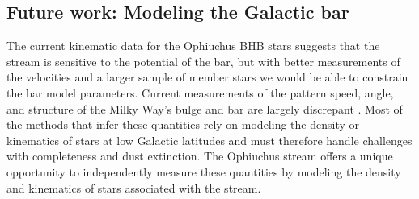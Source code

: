 \documentclass[letterpaper,12pt,preprint]{aastex}
\newcommand{\todo}[1]{{\color{red} TODO: #1}}
\begin{document}
%
%
%
%
%
%

\subsection{Future work: Modeling the Galactic bar}

The current kinematic data for the Ophiuchus BHB stars suggests that the stream is sensitive to the potential of the bar, but with better measurements of the velocities and a larger sample of member stars we would be able to constrain the bar model parameters. Current measurements of the pattern speed, angle, and structure of the Milky Way's bulge and bar are largely discrepant \citep[e.g.,][]{wang12, wang13, antoja14, wegg?? is wegg appropriate here}. Most of the methods that infer these quantities rely on modeling the density or kinematics of stars at low Galactic latitudes and must therefore handle challenges with completeness and dust extinction. The Ophiuchus stream offers a unique opportunity to independently measure these quantities by modeling the density and kinematics of stars associated with the stream. 
\end{document}
